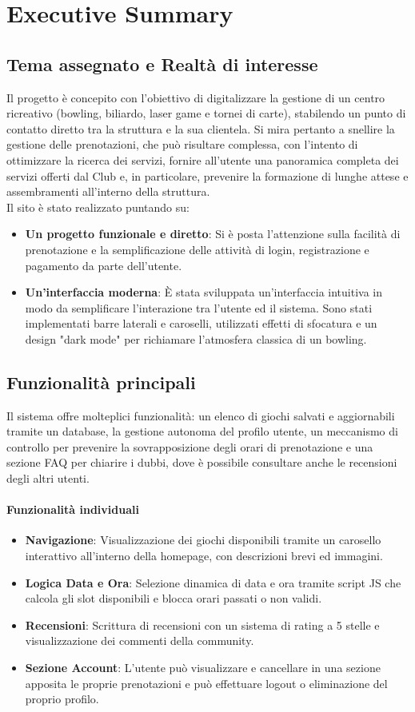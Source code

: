 \documentclass[a4paper, twoside]{report}
\begin{document}
\chapter{Executive Summary}
\section{Tema assegnato e Realtà di interesse}
Il progetto è concepito con l'obiettivo di digitalizzare la gestione di un centro ricreativo (bowling, biliardo, laser game e tornei di carte), stabilendo un punto di contatto diretto tra la struttura e la sua clientela. Si mira pertanto a snellire la gestione delle prenotazioni, che può risultare complessa, con l'intento di ottimizzare la ricerca dei servizi, fornire all'utente una panoramica completa dei servizi offerti dal Club e, in particolare, prevenire la formazione di lunghe attese e assembramenti all'interno della struttura.\\
Il sito è stato realizzato puntando su:
\begin{itemize}
    \item \textbf{Un progetto funzionale e diretto}: Si è posta l’attenzione sulla facilità di prenotazione e la semplificazione delle attività di login, registrazione e pagamento da parte dell’utente.
    \item \textbf{Un'interfaccia moderna}: È stata sviluppata un’interfaccia intuitiva in modo da semplificare l’interazione tra l’utente ed il sistema. Sono stati implementati barre laterali e caroselli, utilizzati effetti di sfocatura e un design "dark mode" per richiamare l'atmosfera classica di un bowling.
\end{itemize}
\section{Funzionalità principali}
Il sistema offre molteplici funzionalità: un elenco di giochi salvati e aggiornabili tramite un database, la gestione autonoma del profilo utente, un meccanismo di controllo per prevenire la sovrapposizione degli orari di prenotazione e una sezione FAQ per chiarire i dubbi, dove è possibile consultare anche le recensioni degli altri utenti.
\subsubsection*{Funzionalità individuali}
\begin{itemize}
  \item \textbf{Navigazione}: Visualizzazione dei giochi disponibili tramite un carosello interattivo all’interno della homepage, con descrizioni brevi ed immagini.
  \item \textbf{Logica Data e Ora}: Selezione dinamica di data e ora tramite script JS che calcola gli slot disponibili e blocca orari passati o non validi.
  \item \textbf{Recensioni}: Scrittura di recensioni con un sistema di rating a 5 stelle e visualizzazione dei commenti della community.
  \item \textbf{Sezione Account}: L'utente può visualizzare e cancellare in una sezione apposita le proprie prenotazioni e può effettuare logout o eliminazione del proprio profilo.
\end{itemize}
\end{document}
